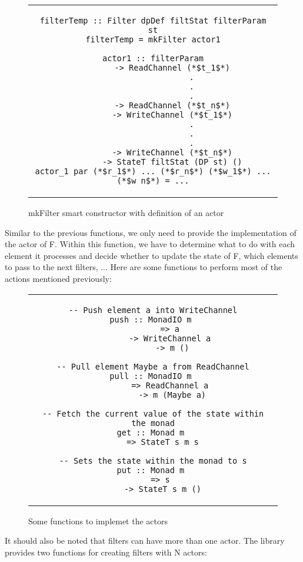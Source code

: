 \begin{figure}[H]
    \begin{tabular}{c}
        \begin{lstlisting}
filterTemp :: Filter dpDef filtStat filterParam st
filterTemp = mkFilter actor1

actor1 :: filterParam
        -> ReadChannel (*$t_1$*)
                .
                .
                .
        -> ReadChannel (*$t_n$*)
        -> WriteChannel (*$t_1$*)
                .
                .
                .
        -> WriteChannel (*$t_n$*)
        -> StateT filtStat (DP st) ()
actor_1 par (*$r_1$*) ... (*$r_n$*) (*$w_1$*) ... (*$w_n$*) = ...
        \end{lstlisting}
    \end{tabular}
    \caption[{[Code]} mkFilter and actors]{mkFilter smart constructor with definition of an actor}
    \label{fig:HC9}
\end{figure}

Similar to the previous functions, we only need to provide the implementation of the actor of F.
Within this function, we have to determine what to do with each element it processes and decide whether to update the state of F, which elements to pass to the next filters, ...
Here are some functions to perform most of the actions mentioned previously:

\begin{figure}[H]
    \begin{tabular}{c}
        \begin{lstlisting}
-- Push element a into WriteChannel
push :: MonadIO m 
        => a 
        -> WriteChannel a 
        -> m ()

-- Pull element Maybe a from ReadChannel
pull :: MonadIO m 
        => ReadChannel a 
        -> m (Maybe a)

-- Fetch the current value of the state within the monad
get :: Monad m 
    => StateT s m s

-- Sets the state within the monad to s
put :: Monad m 
    => s 
    -> StateT s m ()
        \end{lstlisting}
    \end{tabular}
    \caption[{[Code]}Building actors]{Some functions to implemet the actors}
    \label{fig:HC10}
\end{figure}

It should also be noted that filters can have more than one actor.
The library provides two functions for creating filters with N actors:

